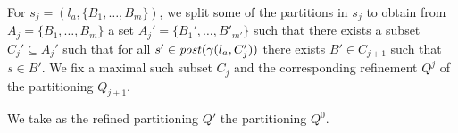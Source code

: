 For $s_j  =(l_a,\{B_1,\ldots,B_m\})$, we split some of the partitions in $s_j$ to obtain from $A_j = \{B_1,\ldots,B_m\}$ a set $A_j' = \{B_1',\ldots, B'_{m'}\}$ such that there exists a subset $C_j'\subseteq A_j'$ such that for all $s' \in \mathit{post}(\gamma(l_a,C_j'))$ there exists $B' \in C_{j+1}$ such that $s \in B'$. We fix a maximal such subset $C_j$ and the corresponding refinement $Q^j$ of the partitioning $Q_{j+1}$. 

We take as the refined partitioning $Q'$ the partitioning $Q^0$.

\begin{example}
\end{example}
